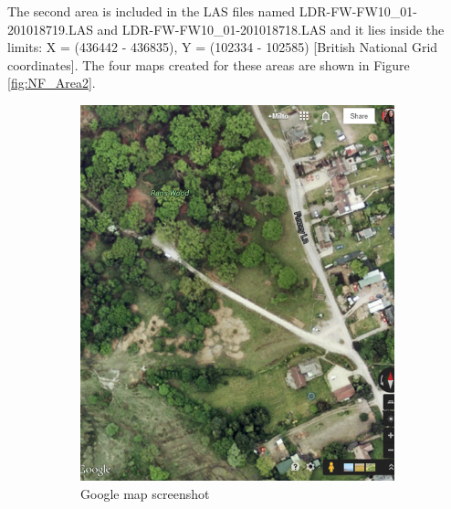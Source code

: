 \documentclass{subfiles}
\begin{document}
	   
	   
	   \newpage
	   \par The second area is included in the LAS files named LDR-FW-FW10\_01-201018719.LAS and LDR-FW-FW10\_01-201018718.LAS and it lies inside the limits:  X = (436442 - 436835), Y = (102334 - 102585) [British National Grid coordinates]. The four maps created for these areas are shown in Figure \ref{fig:NF_Area2}.
	   
	   \begin{figure} [h!]
	   	\begin{subfigure}[t]{.5\textwidth}
	   		\centering
	   		\includegraphics[width=.9\textwidth]{img/NewForest/Area2GoogleMap}
	   		\caption{Google map screenshot}
	   		\label{fig:Area2GoogleMap}
	   	\end{subfigure} \hfill
	   	\begin{subfigure}[t]{.5\textwidth}
	   		\centering

\end{subfigure}
\end{figure}
\end{document}
